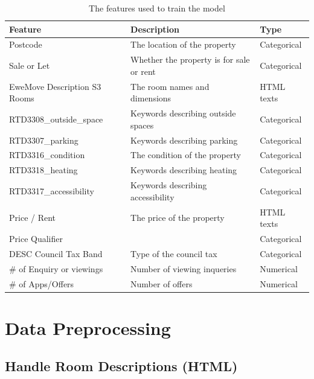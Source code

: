 \documentclass[12pt,twoside]{report}
\begin{document}
\begin{table}[h]
	\centering
	\caption{The features used to train the model}
	\label{model_input_features}
	\begin{tabular}{| l | l | l |}
		\hline
		\textbf{Feature} & \textbf{Description} & \textbf{Type} \\
		\hline
		Postcode & The location of the property & Categorical \\
		\hline
		Sale or Let & Whether the property is for sale or rent & Categorical \\
		\hline
		EweMove Description S3 Rooms & The room names and dimensions & HTML texts\\
		\hline
		RTD3308\_outside\_space & Keywords describing outside spaces & Categorical \\ 
		\hline
		RTD3307\_parking& Keywords describing parking & Categorical \\
		\hline
		RTD3316\_condition & The condition of the property & Categorical \\
		\hline
		RTD3318\_heating & Keywords describing heating & Categorical \\
		\hline
		RTD3317\_accessibility & Keywords describing accessibility & Categorical \\
		\hline
		Price / Rent & The price of the property & HTML texts \\
		\hline
		Price Qualifier & & Categorical \\
		\hline
		DESC Council Tax Band & Type of the council tax & Categorical \\
		\hline
		\# of Enquiry or viewings & Number of viewing inqueries & Numerical \\
		\hline
		\# of Apps/Offers & Number of offers & Numerical \\
		\hline
	\end{tabular}
\end{table}

\section{Data Preprocessing}

\subsection{Handle Room Descriptions (HTML)}
\end{document}
